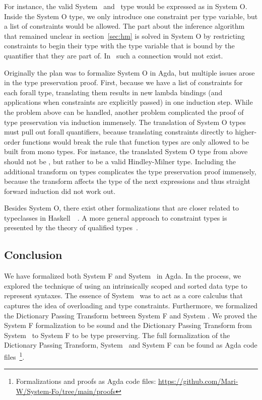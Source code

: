 \noindent For instance, the valid System \Fo\ and \HMo\ type  would be expressed as  in System O. 
Inside the System O type, we only introduce one constraint per type variable, but a list of constraints would be allowed. 
The part about the inference algorithm that remained unclear in section~\ref{sec:hm} is solved in System O by restricting constraints to begin their type with the type variable that is bound by the quantifier that they are part of. 
In \HMo\ such a connection would not exist.

\noindent Originally the plan was to formalize System O in Agda, but multiple issues arose in the type preservation proof. 
First, because we have a list of  constraints for each forall type, translating them results in  new lambda bindings (and  applications when constraints are explicitly passed) in one induction step. 
While the problem above can be handled, another problem complicated the proof of type preservation via induction immensely. The translation of System O types must pull out forall quantifiers, because translating constraints directly to higher-order functions would break the rule that function types are only allowed to be built from mono types. 
For instance, the translated System O type from above should not be , but rather  to be a valid Hindley-Milner type. 
Including the additional transform on types complicates the type preservation proof immensely, because the transform affects the type of the next  expressions and thus straight forward induction did not work out.

\noindent Besides System O, there exist other formalizations that are closer related to typeclasses in Haskell~\cite{ahp}~\cite{tc}. A more general approach to constraint types is presented by the theory of qualified types~\cite{qt}.

\subsection{Conclusion}
We have formalized both System F and System \Fo\ in Agda.
In the process, we explored the technique of using an intrinsically scoped and sorted data type to represent syntaxes.
The essence of System \Fo\ was to act as a core calculus that captures the idea of overloading and type constraints.
Furthermore, we formalized the Dictionary Passing Transform between System F and System \Fo. 
We proved the System F formalization to be sound and the Dictionary Passing Transform from System \Fo\ to System F to be type preserving. 
The full formalization of the Dictionary Passing Transform, System \Fo\ and  System F can be found as Agda code files~\footnote{Formalizations and proofs as Agda code files: \url{https://github.com/Mari-W/System-Fo/tree/main/proofs}}. 

